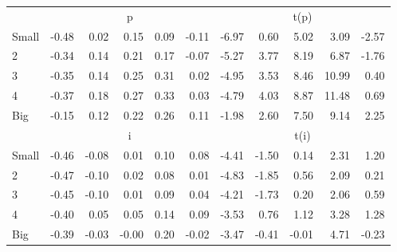 \begin{table}[!ht]
\begin{tabular}{lrrrrrrrrrr}
      & \multicolumn{5}{c}{p} & \multicolumn{5}{c}{t(p)}
    
    \\
      \cmidrule(r){2-6} \cmidrule(r){7-11}

    Small   & -0.48  & 0.02  & 0.15  & 0.09  & -0.11  & -6.97  & 0.60  & 5.02  & 3.09  & -2.57  \\
         2  & -0.34  & 0.14  & 0.21  & 0.17  & -0.07  & -5.27  & 3.77  & 8.19  & 6.87  & -1.76  \\
         3  & -0.35  & 0.14  & 0.25  & 0.31  & 0.02  & -4.95  & 3.53  & 8.46  & 10.99  & 0.40  \\
         4  & -0.37  & 0.18  & 0.27  & 0.33  & 0.03  & -4.79  & 4.03  & 8.87  & 11.48  & 0.69  \\
    Big     & -0.15  & 0.12  & 0.22  & 0.26  & 0.11  & -1.98  & 2.60  & 7.50  & 9.14  & 2.25  \\

  
    
      & \multicolumn{5}{c}{i} & \multicolumn{5}{c}{t(i)}
    
    \\
      \cmidrule(r){2-6} \cmidrule(r){7-11}

    Small   & -0.46  & -0.08  & 0.01  & 0.10  & 0.08  & -4.41  & -1.50  & 0.14  & 2.31  & 1.20  \\
         2  & -0.47  & -0.10  & 0.02  & 0.08  & 0.01  & -4.83  & -1.85  & 0.56  & 2.09  & 0.21  \\
         3  & -0.45  & -0.10  & 0.01  & 0.09  & 0.04  & -4.21  & -1.73  & 0.20  & 2.06  & 0.59  \\
         4  & -0.40  & 0.05  & 0.05  & 0.14  & 0.09  & -3.53  & 0.76  & 1.12  & 3.28  & 1.28  \\
    Big     & -0.39  & -0.03  & -0.00  & 0.20  & -0.02  & -3.47  & -0.41  & -0.01  & 4.71  & -0.23  \\

  

  \bottomrule
\end{tabular}
\label{tbl:25_Size_Prior_F15}
\end{table}